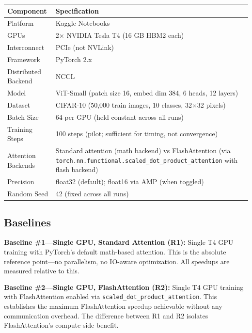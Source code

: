 \documentclass[12pt, a4paper]{article}
\begin{document}
\begin{singlespace}
\small
\begin{tabularx}{\textwidth}{>{\raggedright\arraybackslash}p{4cm} X}
\toprule
\textbf{Component} & \textbf{Specification} \\
\midrule
Platform & Kaggle Notebooks \\
GPUs & 2$\times$ NVIDIA Tesla T4 (16 GB HBM2 each) \\
Interconnect & PCIe (not NVLink) \\
Framework & PyTorch 2.x \\
Distributed Backend & NCCL \\
Model & ViT-Small (patch size 16, embed dim 384, 6 heads, 12 layers) \\
Dataset & CIFAR-10 (50,000 train images, 10 classes, 32$\times$32 pixels) \\
Batch Size & 64 per GPU (held constant across all runs) \\
Training Steps & 100 steps (pilot; sufficient for timing, not convergence) \\
Attention Backends & Standard attention (math backend) vs FlashAttention (via \texttt{torch.nn.functional.scaled\_dot\_product\_attention} with flash backend) \\
Precision & float32 (default); float16 via AMP (when toggled) \\
Random Seed & 42 (fixed across all runs) \\
\bottomrule
\end{tabularx}
\end{singlespace}

\subsection{Baselines}

\textbf{Baseline \#1---Single GPU, Standard Attention (R1):}
Single T4 GPU training with PyTorch's default math-based attention. This is the absolute reference point---no parallelism, no IO-aware optimization. All speedups are measured relative to this.

\vspace{1em}
\textbf{Baseline \#2---Single GPU, FlashAttention (R2):}
Single T4 GPU training with FlashAttention enabled via \texttt{scaled\_dot\_product\_attention}. This establishes the maximum FlashAttention speedup achievable without any communication overhead. The difference between R1 and R2 isolates FlashAttention's compute-side benefit.
\end{document}
